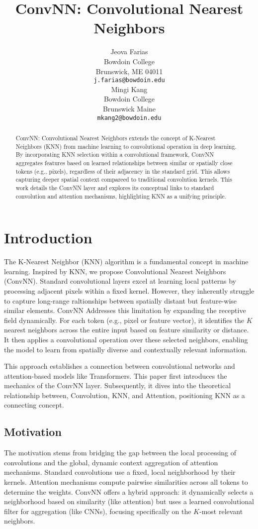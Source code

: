\documentclass{article}
\title{ConvNN: Convolutional Nearest Neighbors}
\author{   
  Jeova Farias \\ 
  Bowdoin College \\
  Brunswick, ME 04011 \\
  \texttt{j.farias@bowdoin.edu} \\ 
  \And 
  Mingi Kang \\
  Bowdoin College \\
  Brunswick Maine \\
  \texttt{mkang2@bowdoin.edu} \\
}
\begin{document}
\maketitle

\begin{abstract}
    ConvNN: Convolutional Nearest Neighbors extends the concept of K-Nearest Neighbors (KNN) from machine learning to convolutional operation in deep learning. By incorporating KNN selection within a convolutional framework, ConvNN aggregates features based on learned relationships between similar or spatially close tokens (e.g., pixels), regardless of their adjacency in the standard grid. This allows capturing deeper spatial context compareed to traditional convolution kernels. This work details the ConvNN layer and explores its conceptual links to standard convolution and attention mechanisms, highlighting KNN as a unifying principle. 
\end{abstract}



\section{Introduction}
The K-Nearest Neighbor (KNN) algorithm is a fundamental concept in machine learning. Inspired by KNN, we propose Convolutional Nearest Neighbors (ConvNN). Standard convolutional layers excel at learning local patterns by processing adjacent pixels within a fixed kernel. However, they inherently struggle to capture long-range raltionships between spatially distant but feature-wise similar elements. ConvNN Addresses this limitation by expanding the receptive field dynamically. For each token (e.g., pixel or feature vector), it identifies the \(K\) nearest neighbors across the entire input based on feature similarity or distance. It then applies a convolutional operation over these selected neighbors, enabling the model to learn from spatially diverse and contextually relevant information. 

This approach establishes a connection between convolutional networks and attention-based models like Transformers. This paper first introduces the mechanics of the ConvNN layer. Subsequently, it dives into the theoretical relationship between, Convolution, KNN, and Attention, positioning KNN as a connecting concept. 

\subsection{Motivation}
The motivation stems from bridging the gap between the local processing of convolutions and the global, dynamic context aggregation of attention mechanisms. Standard convolutions use a fixed, local neighborhood by their kernels. Attention mechanisms compute pairwise similarities across all tokens to determine the weights. ConvNN offers a hybrid approach: it dynamically selects a neighborhood based on similarity (like attention) but uses a learned convolutional filter for aggregation (like CNNs), focusing specifically on the \(K\)-most relevant neighbors. 
\end{document}
